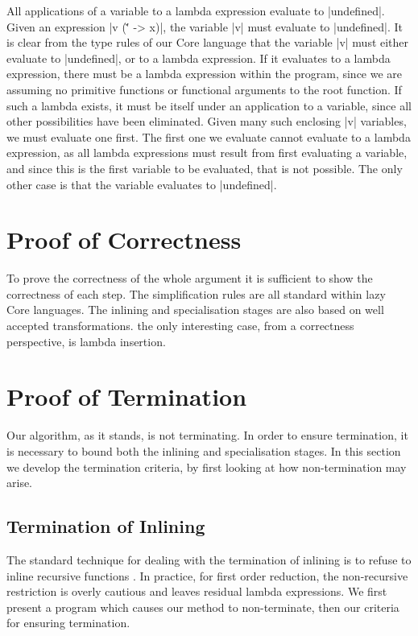 \documentclass[preprint]{sigplanconf}
\let\cite=\citep
\begin{document}
\begin{lemma}{All applications of a variable to a lambda expression evaluate to |undefined|.}
Given an expression |v (\v' -> x)|, the variable |v| must evaluate to |undefined|. It is clear from the type rules of our Core language that the variable |v| must either evaluate to |undefined|, or to a lambda expression. If it evaluates to a lambda expression, there must be a lambda expression within the program, since we are assuming no primitive functions or functional arguments to the root function. If such a lambda exists, it must be itself under an application to a variable, since all other possibilities have been eliminated. Given many such enclosing |v| variables, we must evaluate one first. The first one we evaluate cannot evaluate to a lambda expression, as all lambda expressions must result from first evaluating a variable, and since this is the first variable to be evaluated, that is not possible. The only other case is that the variable evaluates to |undefined|.
\end{lemma}


\section{Proof of Correctness}

To prove the correctness of the whole argument it is sufficient to show the correctness of each step. The simplification rules are all standard within lazy Core languages. The inlining and specialisation stages are also based on well accepted transformations. the only interesting case, from a correctness perspective, is lambda insertion.



\section{Proof of Termination}
\label{sec:firstify_terminate}

Our algorithm, as it stands, is not terminating. In order to ensure termination, it is necessary to bound both the inlining and specialisation stages. In this section we develop the termination criteria, by first looking at how non-termination may arise.


\subsection{Termination of Inlining}

The standard technique for dealing with the termination of inlining is to refuse to inline recursive functions \cite{spj:inlining}. In practice, for first order reduction, the non-recursive restriction is overly cautious and leaves residual lambda expressions. We first present a program which causes our method to non-terminate, then our criteria for ensuring termination.
\end{document}
